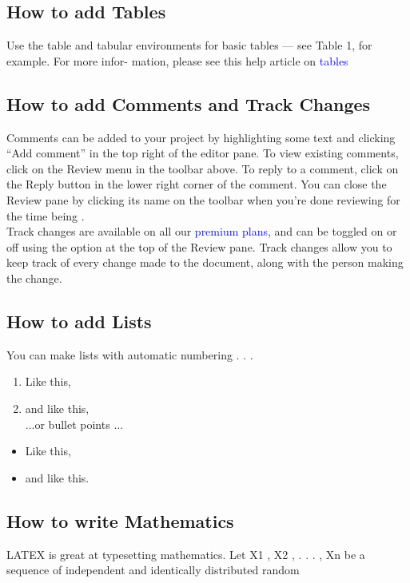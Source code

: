 \documentclass{article}
\begin{document}
	\subsection{How to add Tables}
	Use the table and tabular environments for basic tables — see Table 1, for example. For more infor-
	mation, please see this help article on  \textcolor{blue}{tables}
	\subsection{How to add Comments and Track Changes}
	Comments can be added to your project by highlighting some text and clicking “Add comment” in
	the top right of the editor pane. To view existing comments, click on the Review menu in the toolbar
	above. To reply to a comment, click on the Reply button in the lower right corner of the comment.
	You can close the Review pane by clicking its name on the toolbar when you’re done reviewing for the time being .
	\\
	\hspace{1cm}Track changes are available on all our \textcolor{blue}{premium plans,} and can be toggled on or off using the option
	at the top of the Review pane. Track changes allow you to keep track of every change made to the
	document, along with the person making the change.
	\subsection{How to add Lists}
		You can make lists with automatic numbering . . .
			\begin{enumerate}
		
			\item Like this,
			\item and like this,
			\\
			...or bullet points ...
		
			
		\end{enumerate}
		\begin{itemize}
			\item Like this,
			\item  and like this.
			\
		\end{itemize}
	\subsection{How to write Mathematics}
	LATEX is great at typesetting mathematics. Let X1 , X2 , . . . , Xn be a sequence of independent and
	identically distributed random 
\end{document}
